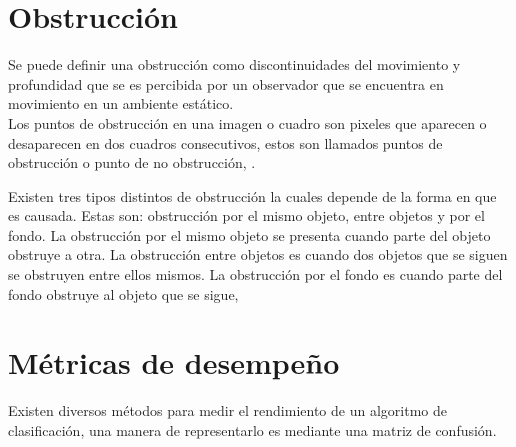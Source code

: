 
\section{Obstrucción}\label{OclusionDef} 

Se puede definir una obstrucción como discontinuidades del movimiento y profundidad que se es percibida por un observador que se encuentra en movimiento en un ambiente estático.\\
Los puntos de obstrucción en una imagen o cuadro son pixeles que aparecen o desaparecen en dos cuadros consecutivos, estos son llamados puntos de obstrucción o punto de no obstrucción, \citep{Silva2001}.  

Existen tres tipos distintos de obstrucción la cuales depende de la forma en que es causada. Estas son: obstrucción por el mismo objeto, entre objetos y por el fondo. La obstrucción por el mismo objeto se presenta cuando parte del objeto obstruye a otra. La obstrucción entre objetos es cuando dos objetos que se siguen se obstruyen entre ellos mismos. La obstrucción por el fondo es cuando parte del fondo obstruye al objeto que se sigue, \citep{YilmazA.JavedO.andShah2006}




\section{Métricas de desempeño}\label{Metricas}

Existen diversos métodos para medir el rendimiento de un algoritmo de clasificación, una manera de representarlo es mediante una matriz de confusión. 


